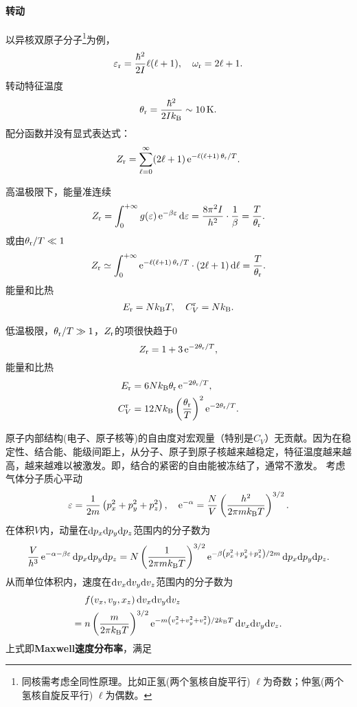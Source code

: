 \paragraph{转动}
以异核双原子分子\footnote{同核需考虑全同性原理。比如正氢(两个氢核自旋平行) $\ell$为奇数；仲氢(两个氢核自旋反平行) $\ell$为偶数。}为例，
\[
	\varepsilon_\mathrm r=\frac{\hbar^2}{2I}\ell(\ell+1),\quad\omega_\mathrm r=2\ell+1.
\]
转动特征温度
\[
	\ct_\rt=\frac{\hbar^2}{2I\kB}\sim\SI{10}\K.
\]
配分函数并没有显式表达式：
\[
	Z_\mathrm r=\sum_{\ell=0}^{\infty}(2\ell+1)\mathop{}\!\mathrm{e}^{-\ell(\ell+1)\,\theta_\mathrm r/T}.
\]
\begin{compactitem}
	\item
	高温极限下，能量准连续
	\[
		Z_\mathrm r=\int_0^{+\infty} g(\varepsilon)\mathop{}\!\mathrm{e}^{-\beta\varepsilon}\mathop{}\!\mathrm{d}\varepsilon=\frac{8\pi^2I}{h^2}\cdot\frac1\beta=\frac T{\theta_\mathrm r}.
	\]
	或由$\theta_\mathrm r/T\ll 1$
	\[
		Z_\mathrm r\simeq\int_0^{+\infty}\mathop{}\!\mathrm{e}^{-\ell(\ell+1)\,\theta_\mathrm r/T}\cdot(2\ell+1)\mathop{}\!\mathrm{d}\ell=\frac T{\theta_\mathrm r}.
	\]
	能量和比热
	\begin{align}
		E_\mathrm r=Nk_{\mathrm B} T,\quad C_V^\mathrm r=Nk_{\mathrm B}.
	\end{align}
	\item 
	低温极限，$\theta_\mathrm r/T\gg 1$，$Z_\mathrm r$的项很快趋于0
	\[
		Z_\mathrm r=1+3\mathop{}\!\mathrm{e}^{-2\theta_\mathrm r/T},
	\]
	能量和比热
	\begin{align}
		E_\mathrm r&=6Nk_{\mathrm B}\theta_\mathrm r\mathop{}\!\mathrm{e}^{-2\theta_\mathrm r/T},\\
		C_V^\mathrm r&=12Nk_{\mathrm B}\left(\frac{\theta_\mathrm r}T\right)^2\mathop{}\!\mathrm{e}^{-2\theta_\mathrm r/T}.
	\end{align}
\end{compactitem}
原子内部结构(电子、原子核等)的自由度对宏观量（特别是$C_V$）无贡献。因为在稳定性、结合能、能级间距上，从分子、原子到原子核越来越稳定，特征温度越来越高，越来越难以被激发。即，结合的紧密的自由能被冻结了，通常不激发。
考虑气体分子质心平动
\[
	\varepsilon=\frac1{2m}\left(p_x^2+p_y^2+p_z^2\right),\quad \mathop{}\!\mathrm{e}^{-\alpha}=\frac NV\left(\frac{h^2}{2\pi mk_{\mathrm B} T}\right)^{3/2}.
\]
在体积$V$内，动量在$\mathop{}\!\mathrm{d} p_x\mathrm{d} p_y\mathrm{d} p_z$范围内的分子数为
\[
	\frac V{h^3}\mathop{}\!\mathrm{e}^{-\alpha-\beta\varepsilon}\mathop{}\!\mathrm{d} p_x\mathrm{d} p_y\mathrm{d} p_z=N\left(\frac1{2\pi mk_{\mathrm B} T}\right)^{3/2}\mathop{}\!\mathrm{e}^{-\beta\left(p_x^2+p_y^2+p_z^2\right)/2m}\mathop{}\!\mathrm{d} p_x\mathrm{d} p_y\mathrm{d} p_z.
\]
从而单位体积内，速度在$\mathop{}\!\mathrm{d} v_x\mathrm{d} v_y\mathrm{d} v_z$范围内的分子数为
\begin{align}
	\begin{aligned}
		&f(v_x,v_y,x_z)\mathop{}\!\mathrm{d} v_x\mathrm{d} v_y\mathrm{d} v_z\\
		=\;&n\left(\frac m{2\pi k_{\mathrm B} T}\right)^{3/2}\mathop{}\!\mathrm{e}^{-m\left(v_x^2+v_y^2+v_z^2\right)/2k_{\mathrm B} T}\mathop{}\!\mathrm{d} v_x\mathrm{d} v_y\mathrm{d} v_z.
	\end{aligned}
\end{align}
上式即\textbf{Maxwell速度分布率}，满足
